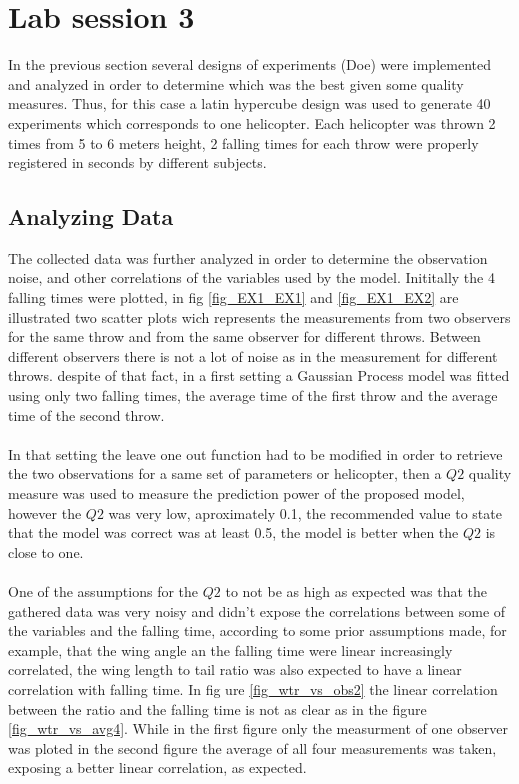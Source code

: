 \section{Lab session 3}

In the previous section several designs of experiments (Doe) were implemented and analyzed in order to determine which was the best given some quality measures. Thus, for this case a latin hypercube design was used to generate 40 experiments which corresponds to one helicopter. Each helicopter was thrown 2 times from 5 to 6 meters height, 2 falling times for each throw were properly registered in seconds by different subjects.

\subsection{Analyzing Data}

The collected data was further analyzed in order to determine the observation noise, and other correlations of the variables used by the model. Inititally the 4 falling times were plotted, in fig \ref{fig_EX1_EX1} and \ref{fig_EX1_EX2} are illustrated two scatter plots wich represents the measurements from two observers for the same throw and from the same observer for different throws. Between different observers there is not a lot of noise as in the measurement for different throws. despite of that fact, in a first setting a Gaussian Process model was fitted using only two falling times, the average time of the first throw and the average time of the second throw.

\paragraph{}
In that setting the leave one out function had to be modified in order to retrieve the two observations for a same set of parameters or helicopter, then a $Q2$ quality measure was used to measure the prediction power of the proposed model, however the $Q2$ was very low, aproximately 0.1, the recommended value to state that the model was correct was at least 0.5, the model is better when the $Q2$ is close to one.

\paragraph{}
One of the assumptions for the $Q2$ to not be as high as expected was that the gathered data was very noisy and didn't expose the correlations between some of the variables and the falling time, according to some prior assumptions made, for example, that the wing angle an the falling time were linear increasingly correlated, the wing length to tail ratio was also expected to have a linear correlation with falling time. In fig ure
\ref{fig_wtr_vs_obs2} the linear correlation between the ratio and the falling time is not as clear as in the figure \ref{fig_wtr_vs_avg4}. While in the first figure only the measurment of one observer was ploted in the second figure the average of all four measurements was taken, exposing a better linear correlation, as expected.



